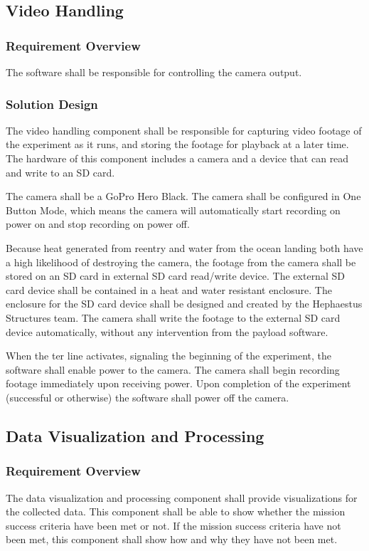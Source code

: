 \documentclass[letterpaper,10pt]{article}
\begin{document}
\subsection{Video Handling}
\subsubsection{Requirement Overview}
The software shall be responsible for controlling the camera output.

\subsubsection{Solution Design}
The video handling component shall be responsible for capturing video footage of
the experiment as it runs, and storing the footage for playback at a later time.
The hardware of this component includes a camera and a device that can read
and write to an SD card.

The camera shall be a GoPro Hero Black.
The camera shall be configured in One Button Mode, which means the  camera will
automatically start recording on power on and stop recording on power off. 

Because heat generated from reentry and water from the ocean landing both have
a high likelihood of destroying the camera, the footage from the camera shall be
stored on an SD card in external SD card read/write device. 
The external SD card device shall be contained in a heat and water resistant enclosure.
The enclosure for the SD card device shall be designed and created by the Hephaestus Structures team.
The camera shall write the footage to the external SD card device automatically,
without any intervention from the payload software. 

When the \gls{ter} line activates, signaling the beginning of the experiment,
the software shall enable power to the camera.
The camera shall begin recording footage immediately upon receiving power. 
Upon completion of the experiment (successful or otherwise) the software shall
power off the camera. 


\subsection{Data Visualization and Processing}
\subsubsection{Requirement Overview}
The data visualization and processing component shall provide visualizations
for the collected data.
This component shall be able to show whether the mission success criteria have
been met or not.
If the mission success criteria have not been met, this component shall show how
and why they have not been met.
\end{document}
